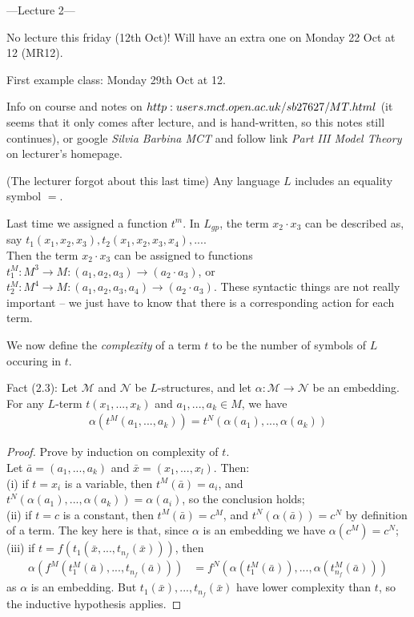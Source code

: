 \documentclass[a4paper]{article}
\begin{document}
---Lecture 2---

No lecture this friday (12th Oct)! Will have an extra one on Monday 22 Oct at 12 (MR12).

First example class: Monday 29th Oct at 12.

Info on course and notes on $http:\\users.mct.open.ac.uk/sb27627/MT.html$ (it seems that it only comes after lecture, and is hand-written, so this notes still continues), or google \emph{Silvia Barbina MCT} and follow link \emph{Part III Model Theory} on lecturer's homepage.

\begin{rem}
    (The lecturer forgot about this last time) Any language $L$ includes an equality symbol $=$.
\end{rem}

Last time we assigned a function $t^m$. In $L_{gp}$, the term $x_2 \cdot x_3$ can be described as, say $t_1(x_1,x_2,x_3),t_2(x_1,x_2,x_3,x_4),...$.\\
Then the term $x_2 \cdot x_3$ can be assigned to functions $t_1^M:M^3\to M:(a_1,a_2,a_3) \to (a_2 \cdot a_3)$, or $t_2^M: M^4 \to M: (a_1,a_2,a_3,a_4) \to (a_2 \cdot a_3)$. These syntactic things are not really important -- we just have to know that there is a corresponding action for each term.

We now define the \emph{complexity} of a term $t$ to be the number of symbols of $L$ occuring in $t$.

Fact (2.3): Let $\mathcal{M}$ and $\mathcal{N}$ be $L$-structures, and let $\alpha:\mathcal{M} \to \mathcal{N}$ be an embedding. For any $L$-term $t(x_1,...,x_k)$ and $a_1,...,a_k \in M$, we have
\begin{equation*}
    \begin{aligned}
        \alpha(t^M(a_1,...,a_k)) = t^N(\alpha(a_1),...,\alpha(a_k))
    \end{aligned}
\end{equation*}
\begin{proof}
Prove by induction on complexity of $t$.\\
Let $\bar{a} = (a_1,...,a_k)$ and $\bar{x} = (x_1,...,x_l)$. Then:\\
(i) if $t=x_i$ is a variable, then $t^M(\bar{a}) = a_i$, and $t^N(\alpha(a_1),...,\alpha(a_k)) = \alpha(a_i)$, so the conclusion holds;\\
(ii) if $t=c$ is a constant, then $t^M(\bar{a}) = c^M$, and $t^N(\alpha(\bar{a})) = c^N$ by definition of a term. The key here is that, since $\alpha$ is an embedding we have $\alpha(c^M) = c^N$;\\
(iii) if $t = f(t_1(\bar{x},...,t_{n_f}(\bar{x})))$, then
\begin{equation*}
    \begin{aligned}
    \alpha(f^M(t_1^M(\bar{a}),...,t_{n_f}(\bar{a}))) &= f^N(\alpha (t_1^M(\bar{a})),...,\alpha(t_{n_f}^M(\bar{a})))
    \end{aligned}
\end{equation*}
as $\alpha$ is an embedding. But $t_1(\bar{x}),...,t_{n_f}(\bar{x})$ have lower complexity than $t$, so the inductive hypothesis applies.
\end{proof}
\end{document}
